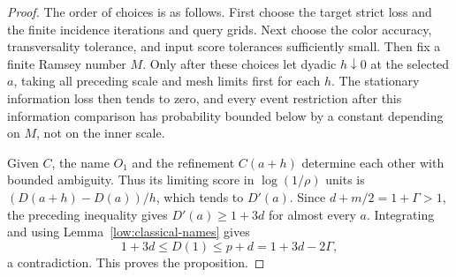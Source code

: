 \begin{proof}
The order of choices is as follows. First choose the target strict
loss and the finite incidence iterations and query grids. Next choose
the color accuracy, transversality tolerance, and input score
tolerances sufficiently small. Then fix a finite Ramsey number $M$.
Only after these choices let dyadic $h\downarrow0$ at the selected
$a$, taking all preceding scale and mesh limits first for each $h$.
The stationary information loss then tends to zero, and every event
restriction after this information comparison has probability bounded
below by a constant depending on $M$, not on the inner scale.

Given $C$, the name $O_1$ and the refinement $C(a+h)$ determine each
other with bounded ambiguity. Thus its limiting score in
$\log(1/\rho)$ units is
$(D(a+h)-D(a))/h$, which tends to $D'(a)$. Since
$d+m/2=1+\Gamma>1$, the preceding inequality gives
$D'(a)\geq1+3d$ for almost every $a$. Integrating and using
Lemma~\ref{low:classical-names} gives
\[
 1+3d\leq D(1)\leq p+d=1+3d-2\Gamma,
\]
a contradiction. This proves the proposition.
\end{proof}
